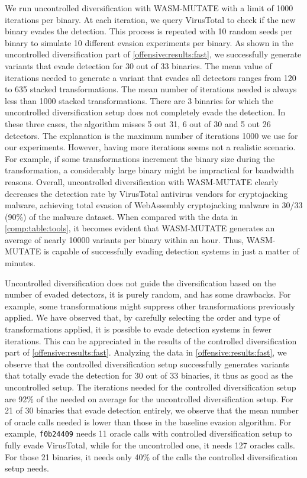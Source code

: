  We run uncontrolled diversification with WASM-MUTATE with a limit of 1000 iterations per binary. 
At each iteration, we query VirusTotal to check if the new binary evades the detection.
This process is repeated with 10 random seeds per binary to simulate 10 different evasion experiments per binary.
As shown in the uncontrolled diversification part of \autoref{offensive:results:fast}, we successfully generate variants that evade detection for 30 out of 33 binaries.
The mean value of iterations needed to generate a variant that evades all detectors ranges from 120 to 635 stacked transformations.
The mean number of iterations needed is always less than 1000 stacked transformations.
There are 3 binaries for which the uncontrolled diversification setup does not completely evade the detection. 
In these three cases, the algorithm misses 5 out 31, 6 out of 30 and 5 out 26 detectors.
The explanation is the maximum number of iterations 1000 we use for our experiments.
However, having more iterations seems not a realistic scenario.
For example, if some transformations increment the binary size during the transformation, a considerably large binary might be impractical for bandwidth reasons.
Overall, uncontrolled diversification with WASM-MUTATE clearly decreases the detection rate by VirusTotal antivirus vendors for cryptojacking malware, achieving total evasion of WebAssembly cryptojacking malware in 30/33 (90\%) of the malware dataset.
When compared with the data in \autoref{comp:table:tools}, it becomes evident that WASM-MUTATE generates an average of nearly 10000 variants per binary within an hour. 
Thus, WASM-MUTATE is capable of successfully evading detection systems in just a matter of minutes.

  Uncontrolled diversification does not guide the diversification based on the number of evaded detectors, it is purely random, and has some drawbacks.
For example, some transformations might suppress other transformations previously applied.
We have observed that, by carefully selecting the order and type of transformations applied, it is possible to evade detection systems in fewer iterations.
This can be appreciated in the results of the controlled diversification part of \autoref{offensive:results:fast}.
Analyzing the data in \autoref{offensive:results:fast}, we observe that the controlled diversification setup successfully generates variants that totally evade the detection for 30 out of 33 binaries, it thus as good as the uncontrolled setup.
The iterations needed for the controlled diversification setup are 92\% of the needed on average for the uncontrolled diversification setup.
For 21 of 30 binaries that evade detection entirely, we observe that the mean number of oracle calls needed is lower than those in the baseline evasion algorithm.
For example, \texttt{f0b24409} needs 11 oracle calls with controlled diversification setup to fully evade VirusTotal, while for the uncontrolled one, it needs 127 oracles calls.
For those 21 binaries, it needs only 40\% of the calls the controlled diversification setup needs.

